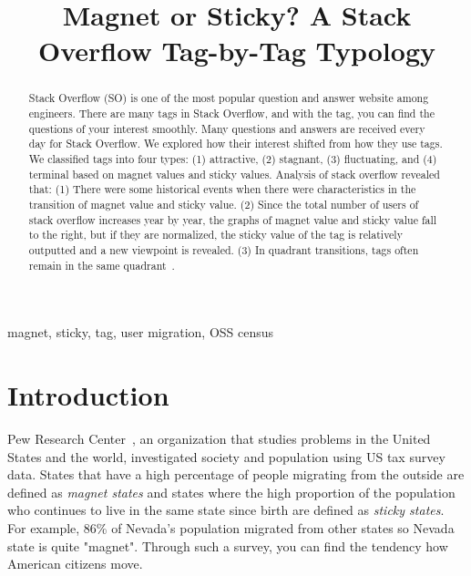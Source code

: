 \documentclass[conference]{IEEEtran}
\begin{document}
\title{Magnet or Sticky? A Stack Overflow Tag-by-Tag Typology\\
}

\maketitle

\begin{abstract}
Stack Overflow (SO) is one of the most popular question and answer website among engineers. There are many tags in Stack Overflow, and with the tag, you can find the questions of your interest smoothly. Many questions and answers are received every day for Stack Overflow. We explored how their interest shifted from how they use tags. We classified tags into four types: (1) attractive, (2) stagnant, (3) fluctuating, and (4) terminal based on magnet values and sticky values. Analysis of stack overflow revealed that: 
(1) There were some historical events when there were characteristics in the transition of magnet value and sticky value.
(2) Since the total number of users of stack overflow increases year by year, the graphs of magnet value and sticky value fall to the right, but if they are normalized, the sticky value of the tag is relatively outputted and a new viewpoint is revealed.
(3) In quadrant transitions, tags often remain in the same quadrant~\cite{yamashita2014magnet}.\\

\end{abstract}

\begin{IEEEkeywords}
magnet, sticky, tag, user migration, OSS census
\end{IEEEkeywords}


\section{Introduction}
Pew Research Center~\cite{communityeconomic}, an organization that studies problems in the United States and the world, investigated society and population using US tax survey data.  States that have a high percentage of people migrating from the outside are defined as \emph{magnet states} and states where the high proportion of the population who continues to live in the same state since birth are defined as \emph{sticky states}. For example, 86\% of Nevada's population migrated from other states so Nevada state is quite "magnet". Through such a survey, you can find the tendency how American citizens move.
\end{document}

